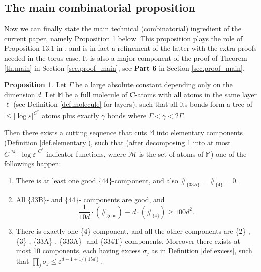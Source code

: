 \documentclass[10pt, reqno]{amsart}
\newcommand{\Mb}{\mathbb M}
\renewcommand{\Mc}{\mathcal M}
\theoremstyle{definition}
\newtheorem{proposition}[theorem]{Proposition}
\theoremstyle{remark}
\numberwithin{equation}{section}
\begin{document}
\subsection{The main combinatorial proposition} Now we can finally state the main technical (combinatorial) ingredient of the current paper, namely Proposition \ref{prop.comb_est_extra} below. This proposition plays the role of Proposition 13.1 in \cite{DHM24}, and is in fact a refinement of the latter with the extra proofs needed in the torus case. It is also a major component of the proof of Theorem \ref{th.main} in Section \ref{sec.proof_main}, see \textbf{Part 6} in Section \ref{sec.proof_main}.
\begin{proposition}\label{prop.comb_est_extra} Let $\Gamma$ be a large absolute constant depending only on the dimension $d$. Let $\Mb$ be a full molecule of C-atoms with all atoms in the same layer $\ell$ (see Definition \ref{def.molecule} for layers), such that all its bonds form a tree of $\leq|\log\varepsilon|^{C^*}$ atoms plus exactly $\gamma$ bonds where $\Gamma<\gamma<2\Gamma$. 

Then there exists a cutting sequence that cuts $\Mb$ into elementary components (Definition \ref{def.elementary}), such that (after decomposing 1 into at most $C^{|\Mc|}|\log\varepsilon|^{C^*}$ indicator functions, where $\Mc$ is the set of atoms of $\Mb$) one of the followings happen:
\begin{enumerate}
\item There is at least one good \{44\}-component, and also $\#_{\{33B\}}=\#_{\{4\}}=0$.
\item All \{33B\}- and \{44\}- components are good, and 
\begin{equation}
\label{eq.extra_case_1}\frac{1}{10d}\cdot(\#_{\mathrm{good}})-d\cdot (\#_{\{4\}})\geq 100d^2.
\end{equation}
\item There is exactly one \{4\}-component, and all the other components are \{2\}-, \{3\}-, \{33A\}-, \{333A\}- and \{334T\}-components. Moreover there exists at most 10 components, each having excess $\sigma_j$ as in Definition \ref{def.excess}, such that $\prod_j\sigma_j\leq\varepsilon^{d-1+1/(15d)}$.
\end{enumerate}
\end{proposition}
\end{document}
